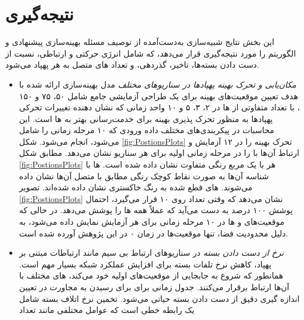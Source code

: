 \section{نتیجه‌گیری}
این بخش نتایج شبیه‌سازی به‌دست‌آمده از توصیف مسئله بهینه‌سازی پیشنهادی و الگوریتم را مورد نتیجه‌گیری قرار می‌دهد، که شامل انرژی حرکتی و ارتباطی، نسبت از دست دادن بسته‌ها، تاخیر، گذردهی، و تعداد های متصل به هر پهپاد می‌شود.

\begin{itemize}
	\item \textit{مکان‌یابی و تحرک بهینه پهپاد‌ها در سناریو‌های مختلف}
	مدل بهینه‌سازی ارائه ‌شده با هدف تعیین موقعیت‌های بهینه  برای یک طراحی آزمایشی جامع شامل ۵۰، ۷۵ و ۱۵۰ ، با تعداد متفاوتی از ها در ۲، ۳، ۵ و ۱۰ واحد زمانی که نشان دهنده تغییرات تحرکی پهپاد‌ها به منظور تحرک پذیری بهینه برای خدمت‌رسانی بهتر به ها است. این محاسبات در پیکربندی‌های مختلف داده ورودی که ۱۰ مرحله زمانی را شامل می‌شود، انجام می‌شود. شکل \ref{fig:PostionsPlots} تحرک بهینه  را در ۱۲ آزمایش و ارتباط آن‌ها با  را در مرحله زمانی اولیه برای هر سناریو نشان می‌دهد. مطابق شکل \ref{fig:PostionsPlots} هر  با یک مربع رنگی متفاوت نشان داده شده است. ها با شناسه آن‌ها به صورت نقاط کوچک رنگی مطابق با  متصل آن‌ها نشان داده می‌شوند. های قطع شده به رنگ خاکستری نشان داده شده‌اند. تصویر \ref{fig:PostionsPlots} نشان می‌دهد که وقتی تعداد  روی ۱۰ قرار می‌گیرد، احتمال پوشش ۱۰۰ درصد  به دست می‌آید که عملاً همه ها را پوشش می‌دهد. در حالی که موقعیت‌های  و ها در ۱۰ مرحله زمانی برای هر آزمایش نمایش داده می‌شود، به دلیل محدودیت فضا، تنها موقعیت‌ها در زمان ۰ در این پژوهش آورده شده است.
	\item \textit{نرخ از دست دادن بسته}
	در سناریوهای ارتباط بی سیم مانند ارتباطات مبتنی بر پهپاد، کاهش نرخ تلفات بسته برای افزایش عملکرد شبکه بسیار مهم است. همانطور که  شروع به جابجایی از موقعیت‌های اولیه خود می‌کند، های مختلف با آن‌ها ارتباط برقرار می‌کنند. جدول زمانی برای  برای رسیدن به مجاورت  در تعیین اندازه گیری دقیق از دست دادن بسته حیاتی می‌شود. تخمین نرخ اتلاف بسته شامل یک رابطه خطی است که عوامل مختلفی مانند تعداد 
\end{itemize}
